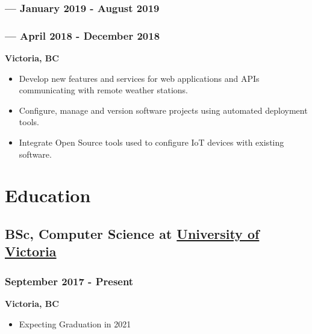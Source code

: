 \documentclass[letterpaper]{article}
\begin{document}
\subsubsection{ --- January 2019 - August 2019}
\label{sec:org96f6945}
\vspace{2.4ex}
\subsubsection{ --- April 2018 - December 2018}
\label{sec:org0a445f7}
\vspace{-1ex}
\textbf{Victoria, BC}
\begin{itemize}
\item Develop new features and services for web applications and APIs communicating with remote weather stations.
\item Configure, manage and version software projects using automated deployment tools.
\item Integrate Open Source tools used to configure IoT devices with existing software.
\end{itemize}
\section{Education}
\label{sec:orgf5e742c}
\subsection{BSc, Computer Science at \href{https://uvic.ca}{University of Victoria}}
\label{sec:org1d035ad}
\subsubsection{September 2017 - Present}
\label{sec:org5571f30}
\textbf{Victoria, BC}
\begin{itemize}
\item Expecting Graduation in 2021
\end{itemize}
\end{document}
